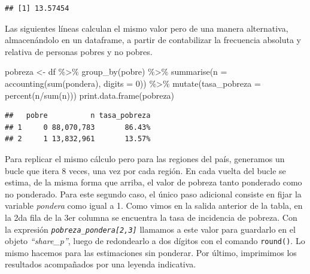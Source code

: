 \documentclass[
]{book}
\newenvironment{Shaded}{\begin{snugshade}}{\end{snugshade}}
\newcommand{\AttributeTok}[1]{\textcolor[rgb]{0.77,0.63,0.00}{#1}}
\newcommand{\DecValTok}[1]{\textcolor[rgb]{0.00,0.00,0.81}{#1}}
\newcommand{\FunctionTok}[1]{\textcolor[rgb]{0.00,0.00,0.00}{#1}}
\newcommand{\NormalTok}[1]{#1}
\newcommand{\OtherTok}[1]{\textcolor[rgb]{0.56,0.35,0.01}{#1}}
\newcommand{\SpecialCharTok}[1]{\textcolor[rgb]{0.00,0.00,0.00}{#1}}
\begin{document}
\begin{verbatim}
## [1] 13.57454
\end{verbatim}

Las siguientes líneas calculan el mismo valor pero de una manera alternativa, almacenándolo en un dataframe, a partir de contabilizar la frecuencia absoluta y relativa de personas pobres y no pobres.

\begin{Shaded}
\begin{Highlighting}[]
\NormalTok{pobreza }\OtherTok{\textless{}{-}}\NormalTok{ df }\SpecialCharTok{\%\textgreater{}\%} \FunctionTok{group\_by}\NormalTok{(pobre) }\SpecialCharTok{\%\textgreater{}\%} \FunctionTok{summarise}\NormalTok{(}\AttributeTok{n =} \FunctionTok{accounting}\NormalTok{(}\FunctionTok{sum}\NormalTok{(pondera), }\AttributeTok{digits =} \DecValTok{0}\NormalTok{)) }\SpecialCharTok{\%\textgreater{}\%} 
                                      \FunctionTok{mutate}\NormalTok{(}\AttributeTok{tasa\_pobreza =} \FunctionTok{percent}\NormalTok{(n}\SpecialCharTok{/}\FunctionTok{sum}\NormalTok{(n))) }
\FunctionTok{print.data.frame}\NormalTok{(pobreza)}
\end{Highlighting}
\end{Shaded}

\begin{verbatim}
##   pobre          n tasa_pobreza
## 1     0 88,070,783       86.43%
## 2     1 13,832,961       13.57%
\end{verbatim}

Para replicar el mismo cálculo pero para las regiones del país, generamos un bucle que itera 8 veces, una vez por cada región. En cada vuelta del bucle se estima, de la misma forma que arriba, el valor de pobreza tanto ponderado como no ponderado. Para este segundo caso, el único paso adicional consiste en fijar la variable \emph{pondera} como igual a 1. Como vimos en la salida anterior de la tabla, en la 2da fila de la 3er columna se encuentra la tasa de incidencia de pobreza. Con la expresión \emph{\texttt{pobreza\_pondera{[}2,3{]}}} llamamos a este valor para guardarlo en el objeto \emph{``share\_p''}, luego de redondearlo a dos dígitos con el comando \texttt{round()}. Lo mismo hacemos para las estimaciones sin ponderar. Por último, imprimimos los resultados acompañados por una leyenda indicativa.
\end{document}
